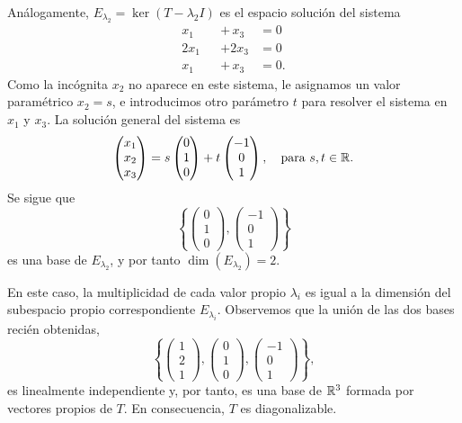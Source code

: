 \documentclass[12pt,a4paper]{book}
\begin{document}
\begin{ejemplo}
        Análogamente, $E_{\lambda_2}=\ker(T-\lambda_2 I)$ es el espacio solución del sistema
        \begin{align*}
            x_1&&+\,x_3&=0\\
            2x_1&&+2x_3&=0\\
            x_1&&+\,x_3&=0.
        \end{align*}
        Como la incógnita $x_2$ no aparece en este sistema, le asignamos un valor paramétrico $x_2=s$, e introducimos otro parámetro $t$ para resolver el sistema en $x_1$ y $x_3$. La solución general del sistema es
        \begin{equation*}
            \begin{pmatrix}x_1\\x_2\\x_3\end{pmatrix}=s\begin{pmatrix}0\\1\\0\end{pmatrix}+t\begin{pmatrix}-1\\0\\1\end{pmatrix}, \quad \text{para } s,t\in\mathbb{R}.
        \end{equation*}
        Se sigue que
        \begin{equation*}
            \left\{\begin{pmatrix}0\\1\\0\end{pmatrix}, \begin{pmatrix}-1\\0\\1\end{pmatrix}\right\}
        \end{equation*}
        es una base de $E_{\lambda_2}$, y por tanto $\dim(E_{\lambda_2})=2$.

        En este caso, la multiplicidad de cada valor propio $\lambda_i$ es igual a la dimensión del subespacio propio correspondiente $E_{\lambda_i}$. Observemos que la unión de las dos bases recién obtenidas,
        \begin{equation*}
            \left\{\begin{pmatrix}1\\2\\1\end{pmatrix}, \begin{pmatrix}0\\1\\0\end{pmatrix}, \begin{pmatrix}-1\\0\\1\end{pmatrix}\right\},
        \end{equation*}
        es linealmente independiente y, por tanto, es una base de $\mathbb{R}^3$ formada por vectores propios de $T$. En consecuencia, $T$ es diagonalizable.
    \end{ejemplo}
\end{document}

